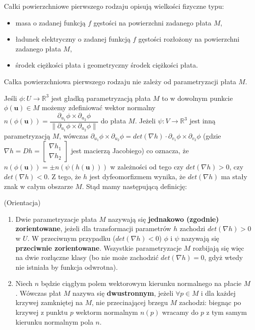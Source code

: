 \begin{przyk}
	Całki powierzchniowe pierwszego rodzaju opisują wielkości fizyczne typu:
	\begin{itemize}
		\item
		masa o zadanej funkcją $f$ gęstości na powierzchni zadanego płata $M$,
		\item
		ładunek elektryczny o zadanej funkcją $f$ gęstości rozłożony na powierzchni zadanego płata $M$,
		\item
		środek ciężkości płata i geometryczny środek ciężkości płata.
	\end{itemize}
\end{przyk}

\begin{tw}
	Całka powierzchniowa pierwszego rodzaju nie zależy od parametryzacji płata $M$.
\end{tw}

\begin{uwg}
	Jeśli $\phi:U\rightarrow\mathbb{R}^3$ jest gładką parametryzacją płata $M$ to w dowolnym punkcie $\phi(\textbf{u})\in M$ możemy zdefiniować wektor normalny $n(\phi(\textbf{u}))=\dfrac{\partial_{u_1}\phi\times\partial_{u_2}\phi}{\|\partial_{u_1}\phi\times\partial_{u_2}\phi\|}$ do płata $M$. Jeżeli $\psi:V\rightarrow\mathbb{R}^3$ jest inną parametryzacją $M$, wówczas $\partial_{u_1}\phi\times\partial_{u_2}\phi=det(\nabla h)\cdot\partial_{v_1}\phi\times\partial_{v_2}\phi$ (gdzie $\nabla h=Dh=\begin{bmatrix} \nabla h_1 \\ \nabla h_2\end{bmatrix}$ jest macierzą Jacobiego) co oznacza, że $n(\phi(\textbf{u}))=\pm n(\psi(h(\textbf{u})))$ w zależności od tego czy $det(\nabla h)>0$, czy $det(\nabla h)<0$. Z tego, że $h$ jest dyfeomorfizmem wynika, że $det(\nabla h)$ ma stały znak w całym obszarze $M$. Stąd mamy następującą definicję:
\end{uwg}

\begin{df}{(Orientacja)}
	\begin{enumerate}[\rm 1.]
		\item
		Dwie parametryzacje płata $M$ nazywają się \textbf{jednakowo (zgodnie) zorientowane}, jeżeli dla transformacji parametrów $h$ zachodzi $det(\nabla h)>0$ w $U$. W przeciwnym przypadku ($det(\nabla h)<0$) $\phi$ i $\psi$ nazywają się \textbf{przeciwnie zorientowane}. Wszystkie parametryzacje $M$ rozbijają się więc na dwie rozłączne klasy (bo nie może zachodzić $det(\nabla h)=0$, gdyż wtedy nie istniała by funkcja odwrotna).
		\item
		Niech $n$ będzie ciągłym polem wektorowym kierunku normalnego na płacie $M$. Wówczas płat $M$ nazywa się \textbf{dwustronnym}, jeżeli $\forall p\in M$ i dla każdej krzywej zamkniętej na $M$, nie przecinającej brzegu $M$ zachodzi: biegnąc po krzywej z punktu $p$ wektorm normalnym $n(p)$ wracamy do $p$ z tym samym kierunku normalnym pola $n$.
	\end{enumerate}
\end{df}

